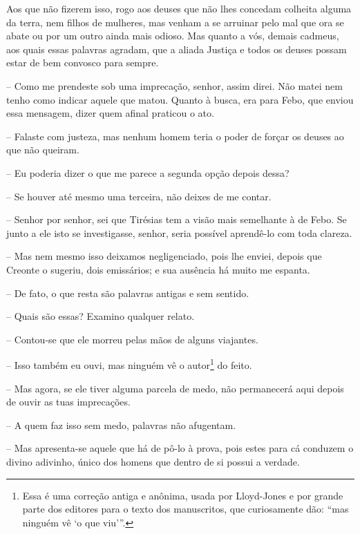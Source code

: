 Aos que não fizerem isso, rogo aos deuses que não lhes concedam colheita
 alguma da terra, nem filhos de mulheres, mas venham a se arruinar
pelo mal que ora se abate ou por um outro ainda mais odioso. Mas quanto
a vós, demais cadmeus, aos quais essas palavras agradam, que a aliada
Justiça e todos os deuses possam estar de bem convosco para sempre.

 --   Como me prendeste sob uma imprecação, senhor, assim direi. Não matei nem
tenho como indicar aquele que matou. Quanto à busca, era para Febo, que
enviou essa mensagem, dizer quem afinal praticou o ato.

 -- Falaste com justeza, mas nenhum homem teria o poder de forçar os
deuses ao que não queiram.

 --   Eu poderia dizer o que me parece a segunda opção depois dessa?

 --   Se houver até mesmo uma terceira, não deixes de me contar.

 --   Senhor por senhor, sei que Tirésias tem a visão mais semelhante à de
Febo. Se junto a ele isto se investigasse, senhor, seria possível
aprendê-lo com toda clareza.

 --   Mas nem mesmo isso deixamos negligenciado, pois lhe enviei, depois que
Creonte o sugeriu, dois emissários; e sua ausência há muito me espanta.

 -- De fato, o que resta são palavras antigas e sem sentido.

 --   Quais são essas? Examino qualquer relato.

 --   Contou-se que ele morreu pelas mãos de alguns viajantes.

 --   Isso também eu ouvi, mas ninguém vê o autor\footnote{Essa é uma correção
  antiga  e anônima, usada por Lloyd-Jones e por grande parte dos
  editores para o texto dos manuscritos, que curiosamente dão: ``mas
  ninguém vê `o que viu'''.} do feito.

 --   Mas agora, se ele tiver alguma parcela de medo, não permanecerá aqui
depois de ouvir as tuas imprecações.

 --   A quem faz isso sem medo, palavras não afugentam.

 --   Mas apresenta-se aquele que há de pô-lo à prova, pois estes para cá
conduzem o divino adivinho, único dos homens que dentro de si possui a
verdade.

